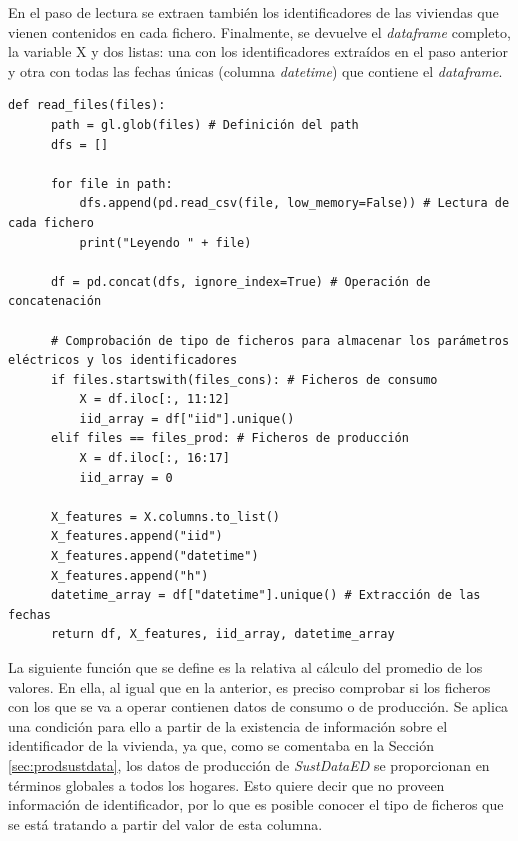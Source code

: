 \vspace{3mm}

En el paso de lectura se extraen también los identificadores de las viviendas que vienen contenidos en cada fichero. Finalmente, se devuelve el \textit{dataframe} completo, la variable X y dos listas: una con los identificadores extraídos en el paso anterior y otra con todas las fechas únicas (columna \textit{datetime}) que contiene el \textit{dataframe}.

\vspace{3mm}

\begin{lstlisting}[style=Python, caption={Función de lectura de los ficheros}]
  def read_files(files):
      path = gl.glob(files) # Definición del path
      dfs = []

      for file in path:
          dfs.append(pd.read_csv(file, low_memory=False)) # Lectura de cada fichero
          print("Leyendo " + file)

      df = pd.concat(dfs, ignore_index=True) # Operación de concatenación

      # Comprobación de tipo de ficheros para almacenar los parámetros eléctricos y los identificadores
      if files.startswith(files_cons): # Ficheros de consumo
          X = df.iloc[:, 11:12]
          iid_array = df["iid"].unique()
      elif files == files_prod: # Ficheros de producción
          X = df.iloc[:, 16:17]
          iid_array = 0

      X_features = X.columns.to_list()
      X_features.append("iid")
      X_features.append("datetime")
      X_features.append("h")
      datetime_array = df["datetime"].unique() # Extracción de las fechas
      return df, X_features, iid_array, datetime_array
\end{lstlisting}

\vspace{3mm}

La siguiente función que se define es la relativa al cálculo del promedio de los valores. En ella, al igual que en la anterior, es preciso comprobar si los ficheros con los que se va a operar contienen datos de consumo o de producción. Se aplica una condición para ello a partir de la existencia de información sobre el identificador de la vivienda, ya que, como se comentaba en la Sección \ref{sec:prodsustdata}, los datos de producción de \textit{SustDataED} se proporcionan en términos globales a todos los hogares. Esto quiere decir que no proveen información de identificador, por lo que es posible conocer el tipo de ficheros que se está tratando a partir del valor de esta columna.

